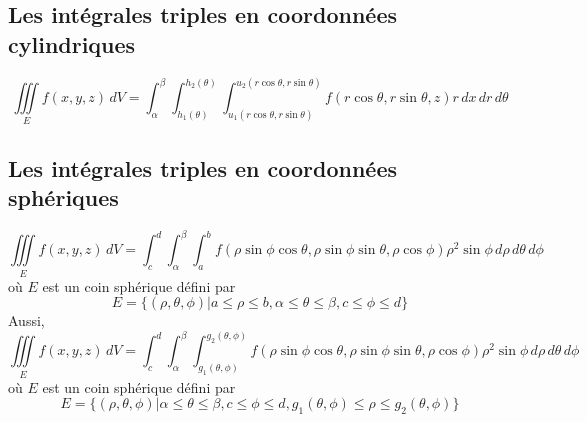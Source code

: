 	\subsection{Les intégrales triples en coordonnées cylindriques}
		\begin{mydef}
		\[\iiint\limits_E f(x,y,z)\, dV =\int_{\alpha}^{\beta}\int_{h_1(\theta)}^{h_2(\theta)}\int_{u_1(r\cos\theta,r\sin\theta)}^{u_2(r\cos\theta,r\sin\theta)}f(r\cos\theta,r\sin\theta,z)r\, dx\, dr\, d\theta\]
	\end{mydef}
	\subsection{Les intégrales triples en coordonnées sphériques}
		\begin{mydef}
	\[\iiint\limits_E f(x,y,z)\, dV=\int_c^d\int_{\alpha}^{\beta}\int_a^b f(\rho\sin\phi\cos\theta,\rho\sin\phi\sin\theta,\rho\cos\phi)\rho^2\sin\phi\, d\rho\, d\theta\, d\phi \] où $E$ est un coin sphérique défini par
	\[E=\big\{ (\rho,\theta,\phi) \lvert a\leq \rho \leq b, \alpha\leq \theta\leq \beta, c\leq\phi\leq d\big\}\]
	Aussi,
	\[\iiint\limits_E f(x,y,z)\, dV=\int_c^d\int_{\alpha}^{\beta}\int_{g_1(\theta,\phi)}^{g_2(\theta,\phi)} f(\rho\sin\phi\cos\theta,\rho\sin\phi\sin\theta,\rho\cos\phi)\rho^2\sin\phi\, d\rho\, d\theta\, d\phi \] où $E$ est un coin sphérique défini par
	\[E=\big\{ (\rho,\theta,\phi) \lvert \alpha\leq\theta\leq\beta, c\leq\phi\leq d, g_1(\theta,\phi)\leq\rho\leq g_2(\theta,\phi) \big\}\]
	
\end{mydef}